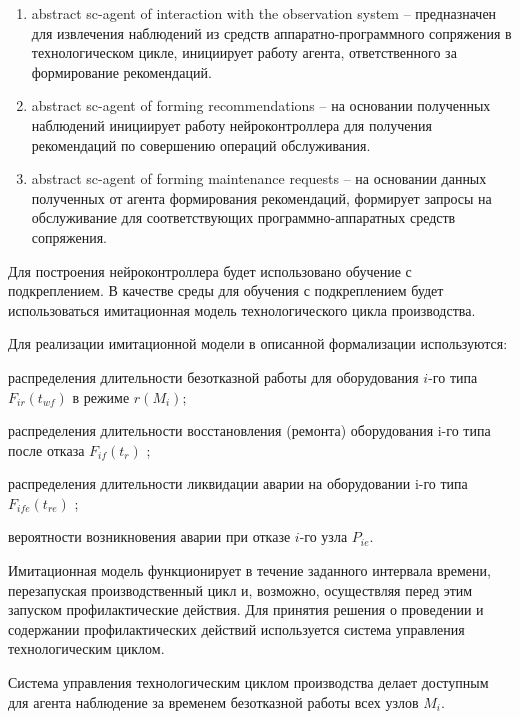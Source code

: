 \begin{enumerate}
    \item abstract sc-agent of interaction with the observation system – предназначен для извлечения наблюдений из средств аппаратно-программного сопряжения в технологическом цикле, инициирует работу агента, ответственного за формирование рекомендаций.
    \item abstract sc-agent of forming recommendations – на основании полученных наблюдений инициирует работу нейроконтроллера для получения рекомендаций по совершению операций обслуживания.
    \item abstract sc-agent of forming maintenance requests – на основании данных полученных от агента формирования рекомендаций, формирует запросы на обслуживание для соответствующих программно-аппаратных средств сопряжения.

\end{enumerate}

Для построения нейроконтроллера будет использовано обучение с подкреплением. В качестве среды для обучения с подкреплением будет использоваться имитационная модель технологического цикла производства.

Для реализации имитационной модели в описанной формализации используются:



\begin{textitemize}
    \item распределения длительности безотказной работы для оборудования $i$-го типа $F_{ir} (t_{wf})$  в режиме $r(M_i)$;
    \item распределения длительности восстановления (ремонта) оборудования i-го типа после отказа $F_{if}(t_r)$ ;
    \item распределения длительности ликвидации аварии на оборудовании i-го типа $F_{ife}(t_{re})$  ;
    \item вероятности возникновения аварии при отказе $i$-го узла $P_{ie}$.
\end{textitemize}


Имитационная модель функционирует в течение заданного интервала времени, перезапуская производственный цикл и, возможно, осуществляя перед этим запуском профилактические действия. Для принятия решения о проведении и содержании профилактических действий используется система управления технологическим циклом.


Система управления технологическим циклом производства делает доступным для агента наблюдение за временем безотказной работы всех узлов $M_i$.


